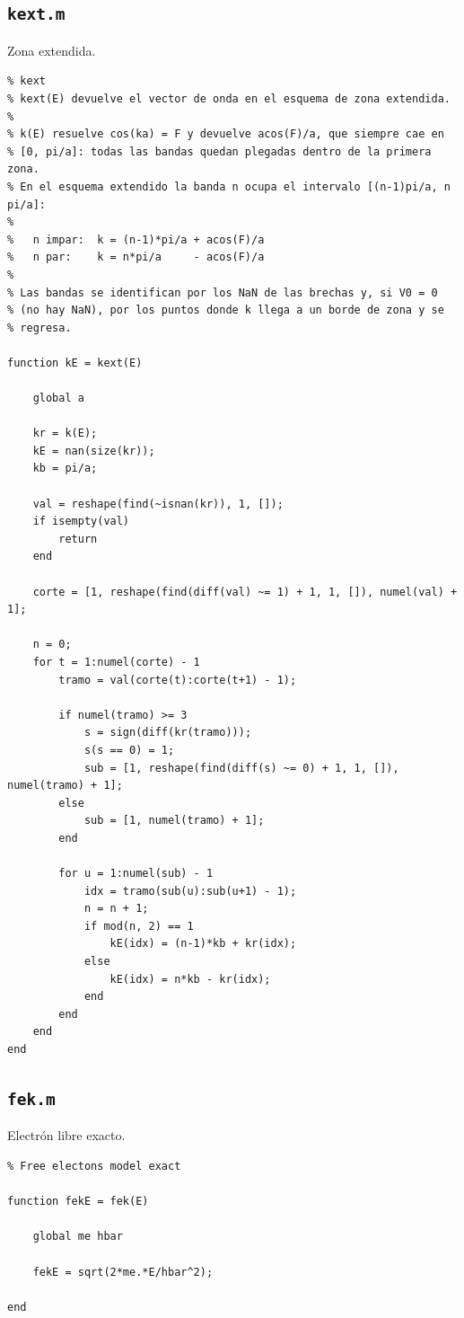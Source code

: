 \documentclass[hidelinks]{article}
\begin{document}
\subsection{\texttt{kext.m}}
Zona extendida.
\begin{lstlisting}
% kext
% kext(E) devuelve el vector de onda en el esquema de zona extendida.
%
% k(E) resuelve cos(ka) = F y devuelve acos(F)/a, que siempre cae en
% [0, pi/a]: todas las bandas quedan plegadas dentro de la primera zona.
% En el esquema extendido la banda n ocupa el intervalo [(n-1)pi/a, n pi/a]:
%
%   n impar:  k = (n-1)*pi/a + acos(F)/a
%   n par:    k = n*pi/a     - acos(F)/a
%
% Las bandas se identifican por los NaN de las brechas y, si V0 = 0
% (no hay NaN), por los puntos donde k llega a un borde de zona y se
% regresa.

function kE = kext(E)

    global a

    kr = k(E);
    kE = nan(size(kr));
    kb = pi/a;

    val = reshape(find(~isnan(kr)), 1, []);
    if isempty(val)
        return
    end

    corte = [1, reshape(find(diff(val) ~= 1) + 1, 1, []), numel(val) + 1];

    n = 0;
    for t = 1:numel(corte) - 1
        tramo = val(corte(t):corte(t+1) - 1);

        if numel(tramo) >= 3
            s = sign(diff(kr(tramo)));
            s(s == 0) = 1;
            sub = [1, reshape(find(diff(s) ~= 0) + 1, 1, []), numel(tramo) + 1];
        else
            sub = [1, numel(tramo) + 1];
        end

        for u = 1:numel(sub) - 1
            idx = tramo(sub(u):sub(u+1) - 1);
            n = n + 1;
            if mod(n, 2) == 1
                kE(idx) = (n-1)*kb + kr(idx);
            else
                kE(idx) = n*kb - kr(idx);
            end
        end
    end
end
\end{lstlisting}

\subsection{\texttt{fek.m}}
Electrón libre exacto.
\begin{lstlisting}
% Free electons model exact

function fekE = fek(E)

    global me hbar

    fekE = sqrt(2*me.*E/hbar^2);

end

\end{lstlisting}
\end{document}
